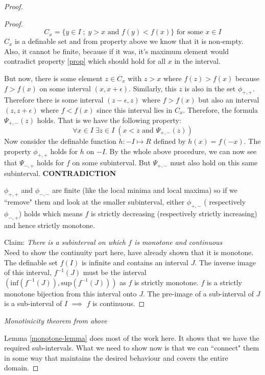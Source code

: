 \begin{proof}
\begin{proof}
\begin{equation*}
            C_x = \{y\in I \; ; \; y>x \text{ and } f(y) < f(x)\} \text{ for some } x \in I
        \end{equation*}
        $C_x$ is a definable set and from property above we know that it is non-empty. Also, it cannot be finite, because if it was, it's maximum element would contradict property \ref{prop} which should hold for all $x$ in the interval.
        \par But now, there is some element $z\in C_x$ with $z > x$ where $f(z) > f(x)$ because $f > f(x)$ on some interval $(x, x + \epsilon)$. Similarly, this $z$ is also in the set $\phi_{+, +}$. Therefore there is some interval $(z - \epsilon, z)$ where $f > f(x)$ but also an interval $(z, z + \epsilon)$ where $f < f(x)$ since this interval lies in $C_x$. Therefore, the formula $\Psi_{+,-}(z)$ holds. That is we have the following property:
        \begin{equation}
        \label{prop2}
            \forall x \in I\; \exists z \in I\; (x < z \text{ and } \Psi_{+, -}(z))
        \end{equation}
        Now consider the definable function $h: -I\mapsto R$ defined by $h(x) = f(-x)$. The property $\phi_{+,+}$ holds for $h$ on $-I$. By the whole above procedure, we can now see that $\Psi_{-,+}$ holds for \textbf{$f$} on some subinterval. But $\Psi_{+,-}$ must also hold on this same subinterval. \textbf{CONTRADICTION}
        \par $\phi_{+,+}$ and $\phi_{-,-}$ are finite (like the local minima and local maxima) so if we ``remove" them and look at the smaller subinterval, either $\phi_{+,-}$ ( respectively $\phi_{-,+}$) holds which means $f$ is strictly decreasing (respectively strictly increasing) and hence strictly monotone.
        \par Claim: \textit{There is a subinterval on which $f$ is monotone and continuous} \\Need to show the continuity part here, have already shown that it is monotone. The definable set $f(I)$ is infinite and contains an interval $J$. The inverse image of this interval, $f^{-1}(J)$ must be the interval $(\text{inf}(f^{-1}(J)), \text{sup}(f^{-1}(J)))$ as $f$ is strictly monotone. $f$ is a strictly monotone bijection from this interval onto $J$. The pre-image of a sub-interval of $J$ is a sub-interval of $I$ $\implies$ $f$ is continuous.
    \end{proof}
    \textit{Monotinicity theorem from above}
    \par Lemma \ref{monotone-lemma} does most of the work here. It shows that we have the required sub-intervals. What we need to show now is that we can ``connect" them in some way that maintains the desired behaviour and covers the entire domain.

\end{proof}
